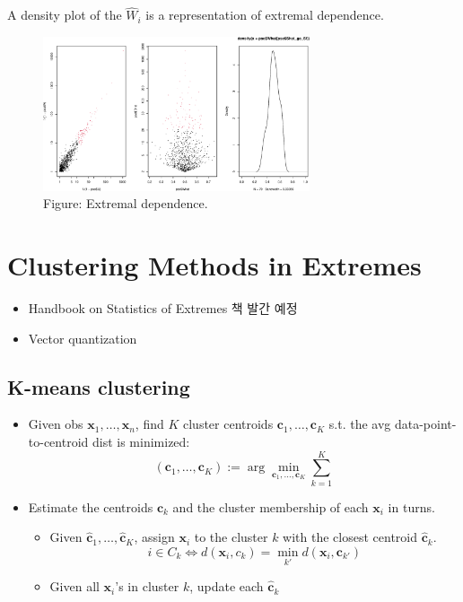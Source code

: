 \documentclass[
  13pt,
  letterpaper,
  DIV=11,
  numbers=noendperiod]{scrreprt}
\providecommand{\tightlist}{%
  \setlength{\itemsep}{0pt}\setlength{\parskip}{0pt}}\usepackage{longtable,booktabs,array}
\theoremstyle{plain}
\theoremstyle{definition}
\theoremstyle{definition}
\theoremstyle{plain}
\theoremstyle{definition}
\theoremstyle{plain}
\theoremstyle{remark}
\begin{document}
A density plot of the \(\hat{W}_i\) is a representation of extremal
dependence.

\begin{figure}[th]

{\centering \includegraphics[width=0.7\textwidth,height=\textheight]{mev_files/figure-pdf/unnamed-chunk-1-1.pdf}

}

\caption{Figure: Extremal dependence.}

\end{figure}%

\section{Clustering Methods in
Extremes}\label{clustering-methods-in-extremes}

\begin{itemize}
\item
  Handbook on Statistics of Extremes 책 발간 예정
\item
  Vector quantization
\end{itemize}

\subsection{K-means clustering}\label{k-means-clustering}

\begin{itemize}
\item
  Given obs \(\pmb{x}_1, \ldots, \pmb{x}_n\), find \(K\) cluster
  centroids \(\pmb{c}_1, \ldots, \pmb{c}_K\) s.t. the avg
  data-point-to-centroid dist is minimized: \[
  (\pmb{c}_1, \ldots, \pmb{c}_K) := \arg\min_{\pmb{c}_1, \ldots, \pmb{c}_K} \sum_{k=1}^K 
  \]
\item
  Estimate the centroids \(\pmb{c}_k\) and the cluster membership of
  each \(\pmb{x}_i\) in turns.

  \begin{itemize}
  \tightlist
  \item
    Given \(\hat{\pmb{c}}_1, \ldots, \hat{\pmb{c}}_K\), assign
    \(\pmb{x}_i\) to the cluster \(k\) with the closest centroid
    \(\hat{\pmb{c}}_k\). \[
    i \in C_k \Longleftrightarrow d(\pmb{x}_i, c_k) = \min_{k'}d(\pmb{x}_i, \pmb{c}_{k'})
    \]
  \item
    Given all \(\pmb{x}_i\)'s in cluster \(k\), update each
    \(\hat{\pmb{c}}_k\)
  \end{itemize}
\end{itemize}
\end{document}
